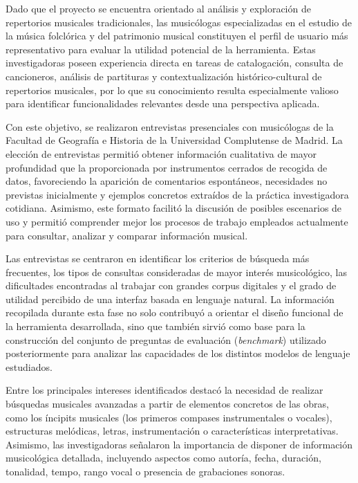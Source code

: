 Dado que el proyecto se encuentra orientado al análisis y exploración de repertorios musicales tradicionales, las musicólogas especializadas en el estudio de la música folclórica y del patrimonio musical constituyen el perfil de usuario más representativo para evaluar la utilidad potencial de la herramienta. Estas investigadoras poseen experiencia directa en tareas de catalogación, consulta de cancioneros, análisis de partituras y contextualización histórico-cultural de repertorios musicales, por lo que su conocimiento resulta especialmente valioso para identificar funcionalidades relevantes desde una perspectiva aplicada.

Con este objetivo, se realizaron entrevistas presenciales con musicólogas de la Facultad de Geografía e Historia de la Universidad Complutense de Madrid. La elección de entrevistas permitió obtener información cualitativa de mayor profundidad que la proporcionada por instrumentos cerrados de recogida de datos, favoreciendo la aparición de comentarios espontáneos, necesidades no previstas inicialmente y ejemplos concretos extraídos de la práctica investigadora cotidiana. Asimismo, este formato facilitó la discusión de posibles escenarios de uso y permitió comprender mejor los procesos de trabajo empleados actualmente para consultar, analizar y comparar información musical.

Las entrevistas se centraron en identificar los criterios de búsqueda más frecuentes, los tipos de consultas consideradas de mayor interés musicológico, las dificultades encontradas al trabajar con grandes corpus digitales y el grado de utilidad percibido de una interfaz basada en lenguaje natural. La información recopilada durante esta fase no solo contribuyó a orientar el diseño funcional de la herramienta desarrollada, sino que también sirvió como base para la construcción del conjunto de preguntas de evaluación (\textit{benchmark}) utilizado posteriormente para analizar las capacidades de los distintos modelos de lenguaje estudiados.

Entre los principales intereses identificados destacó la necesidad de realizar búsquedas musicales avanzadas a partir de elementos concretos de las obras, como los íncipits musicales (los primeros compases instrumentales o vocales), estructuras melódicas, letras, instrumentación o características interpretativas. Asimismo, las investigadoras señalaron la importancia de disponer de información musicológica detallada, incluyendo aspectos como autoría, fecha, duración, tonalidad, tempo, rango vocal o presencia de grabaciones sonoras.

